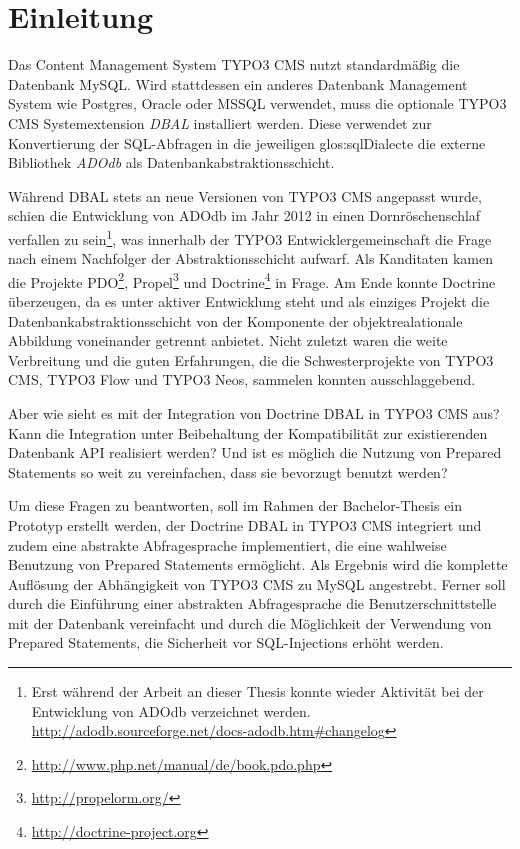 \chapter{Einleitung}
\label{ch:intro}
Das Content Management System TYPO3 CMS nutzt standardmäßig die Datenbank MySQL. Wird stattdessen ein anderes Datenbank Management System wie Postgres, Oracle oder MSSQL verwendet, muss die optionale TYPO3 CMS Systemextension \textit{DBAL} installiert werden. Diese verwendet zur Konvertierung der SQL-Abfragen in die jeweiligen \gls{glos:sqlDialect}e die externe Bibliothek \textit{ADOdb} als Datenbankabstraktionsschicht.

Während DBAL stets an neue Versionen von TYPO3 CMS angepasst wurde, schien die Entwicklung von ADOdb im Jahr 2012 in einen Dornröschenschlaf verfallen zu sein\footnote{Erst während der Arbeit an dieser Thesis konnte wieder Aktivität bei der Entwicklung von ADOdb verzeichnet werden. \url{http://adodb.sourceforge.net/docs-adodb.htm\#changelog}}, was innerhalb der TYPO3 Entwicklergemeinschaft die Frage nach einem Nachfolger der Abstraktionsschicht aufwarf. Als Kanditaten kamen die Projekte PDO\footnote{\url{http://www.php.net/manual/de/book.pdo.php}}, Propel\footnote{\url{http://propelorm.org/}} und Doctrine\footnote{\url{http://doctrine-project.org}} in Frage. Am Ende konnte Doctrine überzeugen, da es unter aktiver Entwicklung steht und als einziges Projekt die Datenbankabstraktionsschicht von der Komponente der objektrealationale Abbildung voneinander getrennt anbietet. Nicht zuletzt waren die weite Verbreitung und die guten Erfahrungen, die die Schwesterprojekte von TYPO3 CMS, TYPO3 Flow und TYPO3 Neos, sammelen konnten ausschlaggebend.

Aber wie sieht es mit der Integration von Doctrine DBAL in TYPO3 CMS aus? Kann die Integration unter Beibehaltung der Kompatibilität zur existierenden Datenbank API realisiert werden? Und ist es möglich die Nutzung von Prepared Statements so weit zu vereinfachen, dass sie bevorzugt benutzt werden?

Um diese Fragen zu beantworten, soll im Rahmen der Bachelor-Thesis ein Prototyp erstellt werden, der Doctrine DBAL in TYPO3 CMS integriert und zudem eine abstrakte Abfragesprache implementiert, die eine wahlweise Benutzung von Prepared Statements ermöglicht. Als Ergebnis wird die komplette Auflösung der Abhängigkeit von TYPO3 CMS zu MySQL angestrebt. Ferner soll durch die Einführung einer abstrakten Abfragesprache die Benutzerschnittstelle mit der Datenbank vereinfacht und durch die Möglichkeit der Verwendung von Prepared Statements, die Sicherheit vor SQL-Injections erhöht werden.

